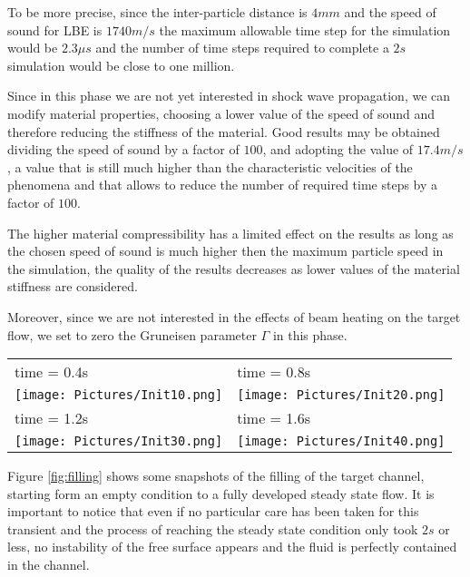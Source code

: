 \documentclass[a4paper, 11pt, twocolumn]{article}
\begin{document}
To be more precise, since the inter-particle distance is $4mm$ and the speed of sound for LBE is $1740m/s$ the maximum allowable time step for the simulation would be $2.3 \mu s$ and the number of time steps required to complete a $2s$ simulation would be close to one million.

Since in this phase we are not yet interested in shock wave propagation, we can modify material properties, choosing a lower value of the speed of sound and therefore reducing the stiffness of the material. Good results may be obtained dividing the speed of sound by a factor of $100$, and adopting the value of $17.4 m/s$, a value that is still much higher than the characteristic velocities of the phenomena and that allows to reduce the number of required time steps by a factor of $100$.

The higher material compressibility has a limited effect on the results as long as the chosen speed of sound is much higher then the maximum particle speed in the simulation, the quality of the results decreases as lower values of the material stiffness are considered.

Moreover, since we are not interested in the effects of beam heating on the target flow, we set to zero the Gruneisen parameter $\Gamma$ in this phase.

\begin{figure*}[t]
\centering
\begin{tabular}{|l|l|}
\hline
\small time = 0.4s & \small time = 0.8s \\ 
\texttt{[image: Pictures/Init10.png]} &
\texttt{[image: Pictures/Init20.png]} \\
\hline
\small time = 1.2s & \small time = 1.6s \\ 
\texttt{[image: Pictures/Init30.png]} &
\texttt{[image: Pictures/Init40.png]} \\
\hline
\end{tabular}
\caption{Fill up of the target channel}
\label{fig:filling}
\end{figure*}

Figure \ref{fig:filling} shows some snapshots of the filling of the target channel, starting form an empty condition to a fully developed steady state flow. It is important to notice that even if no particular care has been taken for this transient and the process of reaching the steady state condition only took $2s$ or less, no instability of the free surface appears and the fluid is perfectly contained in the channel.
\end{document}
